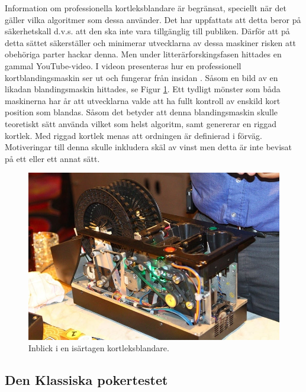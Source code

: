 \documentclass[swedish,a4paper]{article}
\begin{document}
\noindent
\begin{minipage}{0.5\textwidth}
Information om professionella kortleksblandare är 
begränsat, speciellt när det gäller vilka algoritmer som dessa
använder. Det 
har uppfattats att detta beror på säkerhetskall d.v.s. att den ska
inte vara tillgänglig till
publiken. Därför att på detta sättet säkerställer och
minimerar utvecklarna av dessa maskiner risken att
obehöriga parter hackar denna. 
Men under litterärforskingsfasen hittades en gammal YouTube-video.
I videon presenteras hur en professionell kortblandingsmaskin ser ut och
fungerar från insidan \parencite{shufflerVideo}. Såsom en bild av en likadan 
blandingsmaskin hittades, se Figur \ref{fig:casino_shuffler}. Ett 
tydligt mönster som båda maskinerna har år att utvecklarna valde att ha 
fullt kontroll av enskild kort position som blandas. Såsom det betyder att denna
blandingsmaskin skulle teoretiskt sätt använda vilket som helst
algoritm, samt genererar en riggad kortlek. Med riggad kortlek
menas att ordningen är definierad i förväg. Motiveringar till denna skulle
inkludera skäl av vinst men detta är
inte bevisat på ett eller ett annat sätt. 
\end{minipage}%
\hfill
\begin{minipage}{0.5\linewidth}
\begin{figure}[H]
    \centering
    \includegraphics[width=0.9\linewidth]{automatic_card_shuffler.jpg}
    \captionsetup{width=0.5\linewidth}
    \caption{Inblick i en isärtagen kortleksblandare.}
    \label{fig:casino_shuffler}
\end{figure}
\end{minipage}

\subsection{Den Klassiska pokertestet}
\label{sec:poker_test}
\end{document}
